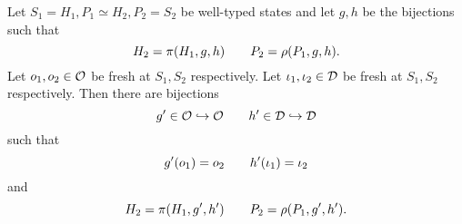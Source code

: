 \begin{proposition}
  Let $S_1 = H_1, P_1 \simeq H_2, P_2 = S_2$ be well-typed states and let $g, h$
  be the bijections such that
  \begin{equation} \label{eq:propnewgh1}
    H_2 = \pi(H_1, g, h) \quad\quad P_2 = \rho(P_1, g, h).
  \end{equation}
  Let $o_1, o_2 \in \mathcal{O}$ be fresh at $S_1, S_2$ respectively.
  Let $\iota_1, \iota_2 \in \mathcal{D}$ be fresh at $S_1, S_2$ respectively.
  Then there are bijections
  \begin{equation*}
    g' \in \mathcal{O} \hookrightarrow \mathcal{O} \quad\quad h' \in \mathcal{D} \hookrightarrow \mathcal{D}
  \end{equation*}
  such that 
  \begin{equation} \label{eq:propnewgh2}
    g'(o_1) = o_2 \quad\quad h'(\iota_1) = \iota_2
  \end{equation} 
  and
  \begin{equation} \label{eq:propnewgh3}
    H_2 = \pi(H_1, g', h') \quad\quad P_2 = \rho(P_1, g', h').
  \end{equation}
\end{proposition}

